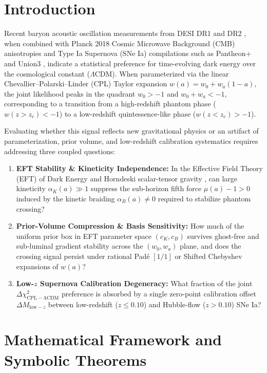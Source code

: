 \documentclass[11pt,a4paper]{article}
\begin{document}
\section{Introduction}
Recent baryon acoustic oscillation measurements from DESI DR1 and DR2 \cite{DESI:2024vi,DESI:2025dr2}, when combined with Planck 2018 Cosmic Microwave Background (CMB) anisotropies \cite{Planck:2018params} and Type Ia Supernova (SNe Ia) compilations such as Pantheon+ \cite{Brout:2022pantheon} and Union3 \cite{Rubin:2023union3}, indicate a statistical preference for time-evolving dark energy over the cosmological constant ($\Lambda$CDM). When parameterized via the linear Chevallier--Polarski--Linder (CPL) Taylor expansion $w(a) = w_0 + w_a(1 - a)$, the joint likelihood peaks in the quadrant $w_0 > -1$ and $w_0 + w_a < -1$, corresponding to a transition from a high-redshift phantom phase ($w(z > z_c) < -1$) to a low-redshift quintessence-like phase ($w(z < z_c) > -1$).

Evaluating whether this signal reflects new gravitational physics or an artifact of parameterization, prior volume, and low-redshift calibration systematics requires addressing three coupled questions:
\begin{enumerate}
    \item \textbf{EFT Stability \& Kineticity Independence:} In the Effective Field Theory (EFT) of Dark Energy and Horndeski scalar-tensor gravity \cite{Gubitosi:2012eft,Bellini:2014maximal,Zumalacarregui:2016hiclass,Tsujikawa:2025crossing}, can large kineticity $\alpha_K(a) \gg 1$ suppress the sub-horizon fifth force $\mu(a) - 1 > 0$ induced by the kinetic braiding $\alpha_B(a) \neq 0$ required to stabilize phantom crossing?
    \item \textbf{Prior-Volume Compression \& Basis Sensitivity:} How much of the uniform prior box in EFT parameter space $(c_K, c_B)$ survives ghost-free and sub-luminal gradient stability across the $(w_0, w_a)$ plane, and does the crossing signal persist under rational Pad\'e $[1/1]$ or Shifted Chebyshev expansions of $w(a)$?
    \item \textbf{Low-$z$ Supernova Calibration Degeneracy:} What fraction of the joint $\Delta\chi^2_{\mathrm{CPL - \Lambda CDM}}$ preference is absorbed by a single zero-point calibration offset $\Delta M_{\mathrm{low-}z}$ between low-redshift ($z \le 0.10$) and Hubble-flow ($z > 0.10$) SNe Ia?
\end{enumerate}

\section{Mathematical Framework and Symbolic Theorems}
\end{document}
